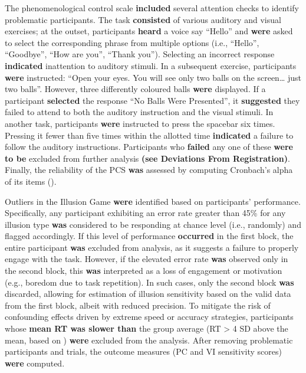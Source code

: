 \documentclass[
  man,
  floatsintext,
  longtable,
  nolmodern,
  notxfonts,
  notimes,
  colorlinks=true,linkcolor=blue,citecolor=blue,urlcolor=blue]{apa7}
\begin{document}
The phenomenological control scale \textbf{included} several attention
checks to identify problematic participants. The task \textbf{consisted}
of various auditory and visual exercises; at the outset, participants
\textbf{heard} a voice say ``Hello'' and \textbf{were} asked to select
the corresponding phrase from multiple options (i.e., ``Hello'',
``Goodbye'', ``How are you'', ``Thank you''). Selecting an incorrect
response \textbf{indicated} inattention to auditory stimuli. In a
subsequent exercise, participants \textbf{were} instructed: ``Open your
eyes. You will see only two balls on the screen\ldots{} just two
balls''. However, three differently coloured balls \textbf{were}
displayed. If a participant \textbf{selected} the response ``No Balls
Were Presented'', it \textbf{suggested} they failed to attend to both
the auditory instruction and the visual stimuli. In another task,
participants \textbf{were} instructed to press the spacebar six times.
Pressing it fewer than five times within the allotted time
\textbf{indicated} a failure to follow the auditory instructions.
Participants who \textbf{failed} any one of these \textbf{were to be}
excluded from further analysis \textbf{(see Deviations From
Registration)}. Finally, the reliability of the PCS \textbf{was}
assessed by computing Cronbach's alpha of its items
().

Outliers in the Illusion Game \textbf{were} identified based on
participants' performance. Specifically, any participant exhibiting an
error rate greater than 45\% for any illusion type \textbf{was}
considered to be responding at chance level (i.e., randomly) and flagged
accordingly. If this level of performance \textbf{occurred} in the first
block, the entire participant \textbf{was} excluded from analysis, as it
suggests a failure to properly engage with the task. However, if the
elevated error rate \textbf{was} observed only in the second block, this
\textbf{was} interpreted as a loss of engagement or motivation (e.g.,
boredom due to task repetition). In such cases, only the second block
\textbf{was} discarded, allowing for estimation of illusion sensitivity
based on the valid data from the first block, albeit with reduced
precision. To mitigate the risk of confounding effects driven by extreme
speed or accuracy strategies, participants whose \textbf{mean RT was
slower than} the group average (RT \textgreater{} 4 SD above the mean,
based on )
\textbf{were} excluded from the analysis. After removing problematic
participants and trials, the outcome measures (PC and VI sensitivity
scores) \textbf{were} computed.
\end{document}
